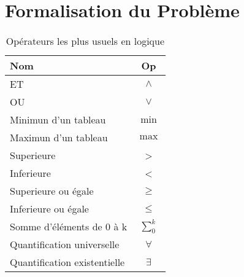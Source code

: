 \section{Formalisation du Problème}\label{formalisation}

\begin{table}[!h]
\centering
\begin{tabular}{l c}
Nom & Op \\
\hline
ET & $\land$ \\
OU & $\lor$ \\
Minimun d'un tableau & $\min$ \\
Maximun d'un tableau & $\max$ \\
Superieure & > \\
Inferieure & < \\
Superieure ou égale & $\ge$ \\
Inferieure ou égale & $\le$ \\
Somme d'éléments de 0 à k & $\sum_{0}^{k}$ \\
Quantification universelle & $\forall$ \\
Quantification existentielle & $\exists$ \\
\end{tabular}
\caption{Opérateurs les plus usuels en logique}
\end{table}
